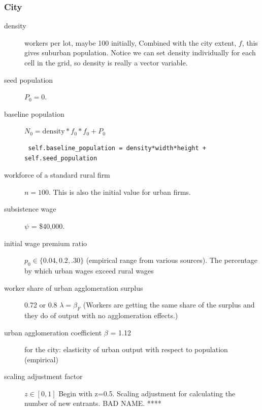  
\subsubsection{City}
\begin{description}
\item [density] workers per lot, maybe 100 initially, Combined with the city extent, $f$, this gives suburban population. %
Notice we can set density individually for each cell in the grid, so density is really a vector variable.  %
\item [seed population] $P_0=0$. %
\item [baseline population]  $N_0=\mathrm{density} * f_0 * f_0 + P_0$ 
\begin{lstlisting}
 self.baseline_population = density*width*height + self.seed_population
\end{lstlisting}

\item [workforce of a standard rural firm] $n=100$. This is also the initial value for urban firms.


\item [subsistence wage] $\psi$ = \$40,000. %


\item [initial wage premium ratio] $p_0\in\{0.04,0.2,.30\}$ (empirical range from various sources). The percentage by which urban wages exceed rural wages 
\item [worker share of urban agglomeration surplus] 0.72 or 0.8 $\lambda=\beta_F$ (Workers are getting the same share of the surplus and they do of output with no agglomeration effects.)
\item [urban agglomeration coefficient $\beta$ = 1.12] for the city: elasticity of urban output with respect to population (empirical)

\item [scaling adjustment factor] $z\in[0,1]$ Begin with z=0.5. Scaling adjustment for calculating the number of new entrants. BAD NAME. ****


\end{description}
